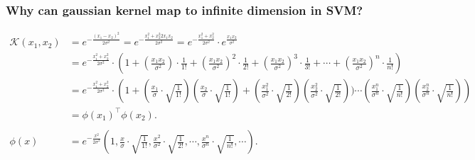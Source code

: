 \documentclass[10pt,onecolumn]{book}
\begin{document}
\subsubsection{Why can gaussian kernel map to infinite dimension in SVM?}
\begin{equation}
\begin{split}
\mathcal{K}(x_1, x_2) &= e^{-\frac{(x_1 - x_2)^2}{2 \sigma^2}} = e^{-\frac{x_1^2 + x_2^2 2 x_1 x_2}{2 \sigma^2}} = e^{-\frac{x_1^2 + x_2^2}{2 \sigma^2}} \cdot e^{\frac{x_1 x_2}{\sigma^2}} \\
&= e^{-\frac{x_1^2 + x_2^2}{2 \sigma^2}} \cdot \left(1 + (\frac{x_1 x_2}{\sigma^2}) \cdot \frac{1}{1!} + (\frac{x_1 x_2}{\sigma^2})^2 \cdot \frac{1}{2!}+ (\frac{x_1 x_2}{\sigma^2})^3 \cdot \frac{1}{3!} + \cdots + (\frac{x_1 x_2}{\sigma^2})^n \cdot \frac{1}{n!}\right) \\
&= e^{-\frac{x_1^2 + x_2^2}{2 \sigma^2}} \cdot \left(1 + (\frac{x_1}{\sigma} \cdot \sqrt{\frac{1}{1!}})(\frac{x_2}{\sigma} \cdot \sqrt{\frac{1}{1!}})  + (\frac{x_1^2}{\sigma^2} \cdot \sqrt{\frac{1}{2!}})(\frac{x_2^2}{\sigma^2} \cdot \sqrt{\frac{1}{2!}})) \cdots (\frac{x_1^n}{\sigma^n} \cdot \sqrt{\frac{1}{n!}})(\frac{x_2^n}{\sigma^n} \cdot \sqrt{\frac{1}{n!}})\right)\\
&= \phi(x_1)^\top \phi(x_2).\\ \\
\phi(x) &= e^{-\frac{x^2}{2 \sigma^2}} \left( 1, \frac{x}{\sigma} \cdot \sqrt{\frac{1}{1!}}, \frac{x^2}{\sigma^2} \cdot \sqrt{\frac{1}{2!}}, \cdots, \frac{x^n}{\sigma^n} \cdot \sqrt{\frac{1}{n!}}, \cdots \right).
\end{split}
\end{equation}
\end{document}
